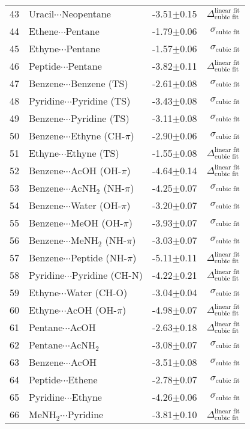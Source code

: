\begin{longtable}{llrr}
43 & Uracil$\cdots$Neopentane & -3.51$\pm$0.15 & $\Delta_\textrm{cubic fit}^\textrm{linear fit}$ \\
44 & Ethene$\cdots$Pentane & -1.79$\pm$0.06 & $\sigma_\textrm{cubic fit}$ \\
45 & Ethyne$\cdots$Pentane & -1.57$\pm$0.06 & $\sigma_\textrm{cubic fit}$ \\
46 & Peptide$\cdots$Pentane & -3.82$\pm$0.11 & $\Delta_\textrm{cubic fit}^\textrm{linear fit}$ \\
47 & Benzene$\cdots$Benzene (TS) & -2.61$\pm$0.08 & $\sigma_\textrm{cubic fit}$ \\
48 & Pyridine$\cdots$Pyridine (TS) & -3.43$\pm$0.08 & $\sigma_\textrm{cubic fit}$ \\
49 & Benzene$\cdots$Pyridine (TS) & -3.11$\pm$0.08 & $\sigma_\textrm{cubic fit}$ \\
50 & Benzene$\cdots$Ethyne (CH-$\pi$) & -2.90$\pm$0.06 & $\sigma_\textrm{cubic fit}$ \\
51 & Ethyne$\cdots$Ethyne (TS) & -1.55$\pm$0.08 & $\Delta_\textrm{cubic fit}^\textrm{linear fit}$ \\
52 & Benzene$\cdots$AcOH (OH-$\pi$) & -4.64$\pm$0.14 & $\Delta_\textrm{cubic fit}^\textrm{linear fit}$ \\
53 & Benzene$\cdots$AcNH$_2$ (NH-$\pi$) & -4.25$\pm$0.07 & $\sigma_\textrm{cubic fit}$ \\
54 & Benzene$\cdots$Water (OH-$\pi$) & -3.20$\pm$0.07 & $\sigma_\textrm{cubic fit}$ \\
55 & Benzene$\cdots$MeOH (OH-$\pi$) & -3.93$\pm$0.07 & $\sigma_\textrm{cubic fit}$ \\
56 & Benzene$\cdots$MeNH$_2$ (NH-$\pi$) & -3.03$\pm$0.07 & $\sigma_\textrm{cubic fit}$ \\
57 & Benzene$\cdots$Peptide (NH-$\pi$) & -5.11$\pm$0.11 & $\Delta_\textrm{cubic fit}^\textrm{linear fit}$ \\
58 & Pyridine$\cdots$Pyridine (CH-N) & -4.22$\pm$0.21 & $\Delta_\textrm{cubic fit}^\textrm{linear fit}$ \\
59 & Ethyne$\cdots$Water (CH-O) & -3.04$\pm$0.04 & $\sigma_\textrm{cubic fit}$ \\
60 & Ethyne$\cdots$AcOH (OH-$\pi$) & -4.98$\pm$0.07 & $\Delta_\textrm{cubic fit}^\textrm{linear fit}$ \\
61 & Pentane$\cdots$AcOH & -2.63$\pm$0.18 & $\Delta_\textrm{cubic fit}^\textrm{linear fit}$ \\
62 & Pentane$\cdots$AcNH$_2$ & -3.08$\pm$0.07 & $\sigma_\textrm{cubic fit}$ \\
63 & Benzene$\cdots$AcOH & -3.51$\pm$0.08 & $\sigma_\textrm{cubic fit}$ \\
64 & Peptide$\cdots$Ethene & -2.78$\pm$0.07 & $\sigma_\textrm{cubic fit}$ \\
65 & Pyridine$\cdots$Ethyne & -4.26$\pm$0.06 & $\sigma_\textrm{cubic fit}$ \\
66 & MeNH$_2$$\cdots$Pyridine & -3.81$\pm$0.10 & $\Delta_\textrm{cubic fit}^\textrm{linear fit}$ \\
\end{longtable}